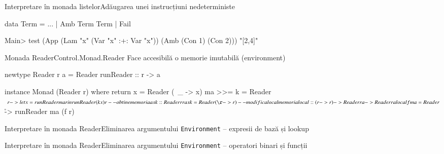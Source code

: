 \documentclass[xcolor=pdftex,romanian,colorlinks]{beamer}
\begin{document}
\begin{frame}[fragile]{Interpretare în monada listelor}{Adăugarea unei instrucțiuni nedeterministe}
\begin{asciihs}
data Term = ... | Amb Term Term | Fail
\end{asciihs}





\begin{asciihs}
Main> test (App (Lam "x" (Var "x" :+: Var "x")) (Amb (Con 1) (Con 2)))
"[2,4]"
\end{asciihs}
\end{frame}

\begin{frame}[fragile]{Monada Reader}{Control.Monad.Reader}
Face accesibilă o memorie imutabilă (environment)
\begin{asciihs}
newtype Reader r a = Reader { runReader :: r -> a }

instance Monad (Reader r) where
  return x = Reader (\ _ -> x)
  ma >>= k = Reader $ \ r ->
    let x = runReader ma r
     in runReader (k x) r

-- obtine memoria
ask :: Reader r r
ask = Reader (\r -> r)

-- modifica local memoria
local :: (r -> r) -> Reader r a -> Reader r a
local f ma = Reader $ \r -> runReader ma (f r)
\end{asciihs}
\end{frame}  

\begin{frame}[fragile]{Interpretare în monada Reader}{Eliminarea argumentului \lstinline$Environment$ -- expresii de bază și lookup}



\end{frame}

\begin{frame}[fragile]{Interpretare în monada Reader}{Eliminarea argumentului \lstinline$Environment$ -- operatori binari și funcții}



\end{frame}
\end{document}
